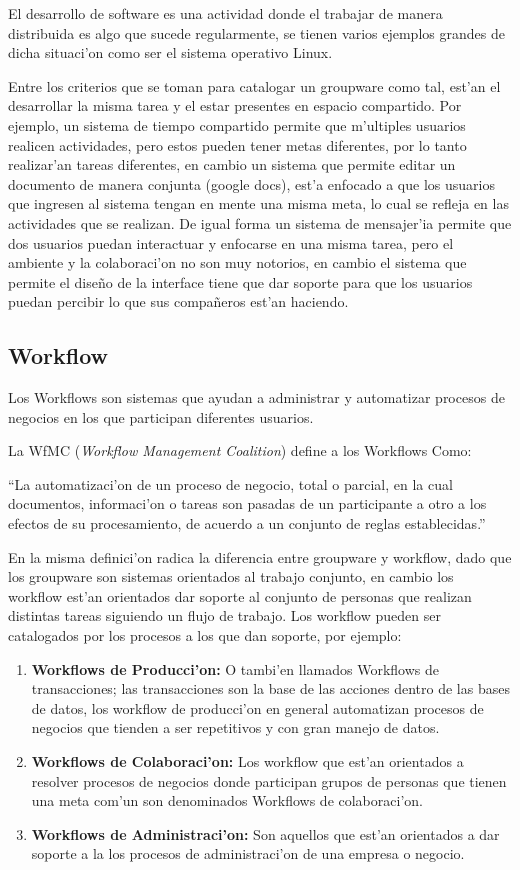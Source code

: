 El desarrollo de software es una actividad donde el trabajar de manera distribuida es algo que sucede regularmente, se tienen varios ejemplos grandes de dicha situaci'on como ser el sistema operativo Linux.

\medskip
Entre los criterios que se toman para catalogar un groupware como tal, est'an el desarrollar la misma tarea y el estar presentes en espacio compartido. Por ejemplo, un sistema de tiempo compartido permite que m'ultiples usuarios realicen actividades, pero estos pueden tener metas diferentes, por lo tanto realizar'an tareas diferentes, en cambio un sistema que permite editar un documento de manera conjunta (google docs), est'a enfocado a que los usuarios que ingresen al sistema tengan en mente una misma meta, lo cual se refleja en las actividades que se realizan. De igual forma un sistema de mensajer'ia permite que dos usuarios puedan interactuar y enfocarse en una misma tarea, pero el ambiente y la colaboraci'on no son muy notorios, en cambio el sistema que permite el dise\~no de la interface tiene que dar soporte para que los usuarios puedan percibir lo que sus compa\~neros est'an haciendo.

\subsection{Workflow}

\medskip
Los Workflows son sistemas que ayudan a administrar y automatizar procesos de negocios en los que participan diferentes usuarios.

La WfMC (\textit{Workflow Management Coalition}) define a los Workflows Como:

\medskip 
``La automatizaci'on de un proceso de negocio, total o parcial, en la cual documentos, informaci'on o tareas son pasadas de un participante a otro a los efectos de su procesamiento, de acuerdo a un conjunto de reglas establecidas.''
\medskip

En la misma definici'on radica la diferencia entre groupware y workflow, dado que los groupware son sistemas orientados al trabajo conjunto, en cambio los workflow est'an orientados dar soporte al conjunto de personas que realizan distintas tareas siguiendo un flujo de trabajo. Los workflow pueden ser catalogados por los procesos a los que dan soporte, por ejemplo:

\begin{enumerate}
	\item \textbf{Workflows de Producci'on:} O tambi'en llamados Workflows de transacciones; las transacciones son la base de las acciones dentro de las bases de datos, los workflow de producci'on en general automatizan procesos de negocios que tienden a ser repetitivos y con gran manejo de datos.
	\item \textbf{Workflows de Colaboraci'on:} Los workflow que est'an orientados a resolver procesos de negocios donde participan grupos de personas que tienen una meta com'un son denominados Workflows de colaboraci'on.
	\item \textbf{Workflows de Administraci'on:} Son aquellos que est'an orientados a dar soporte a la los procesos de administraci'on de una empresa o negocio.
\end{enumerate}
\medskip  

